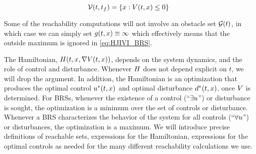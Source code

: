 \begin{equation}
\label{eq:implicitValfuncs}
\mathcal{V}(t, t_f) = \{x: V(t, x) \le 0\}
\end{equation}

Some of the reachability computations will not involve an obstacle set $\mathcal{G}(t)$, in which case we can simply set $g(t, x) \equiv \infty$ which effectively means that the outside maximum is ignored in \eqref{eq:HJIVI_BRS}.

The Hamiltonian, $H(t, x, \nabla V(t,x))$, depends on the system dynamics, and the role of control and disturbance. Whenever $H$ does not depend explicit on $t$, we will drop the argument. In addition, the Hamiltonian is an optimization that produces the optimal control $u^*(t, x)$ and optimal disturbance $d^*(t, x)$, once $V$ is determined. For BRSs, whenever the existence of a control (``$\exists u$'') or disturbance is sought, the optimization is a minimum over the set of controls or disturbance. Whenever a BRS characterizes the behavior of the system for all controls (``$\forall u$'') or disturbances, the optimization is a maximum. We will introduce precise definitions of reachable sets, expressions for the Hamiltonian, expressions for the optimal controls as needed for the many different reachability calculations we use.